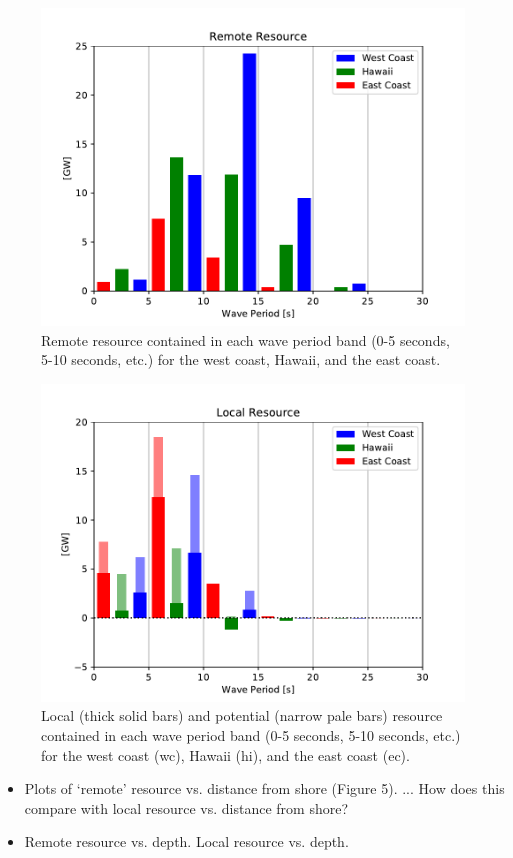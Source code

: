 \begin{figure}[ht]
  \centering
  \includegraphics[width=\linewidth]{../fig/RemoteResource_Freq01.pdf}
  \caption{Remote resource contained in each wave period band (0-5 seconds, 5-10 seconds, etc.) for the west coast, Hawaii, and the east coast.}
  \label{fig:remote-freq}
\end{figure}

\begin{figure}[ht]
  \centering
  \includegraphics[width=\linewidth]{../fig/LocalResource_Freq01.pdf}
  \caption{Local (thick solid bars) and potential (narrow pale bars) resource contained in each wave period band (0-5 seconds, 5-10 seconds, etc.) for the west coast (wc), Hawaii (hi), and the east coast (ec).}
  \label{fig:remote-freq}
\end{figure}

\begin{itemize}
\item Plots of ‘remote’ resource vs. distance from shore (Figure 5). ... How does this compare with local resource vs. distance from shore?
\item Remote resource vs. depth. Local resource vs. depth.
\end{itemize}



